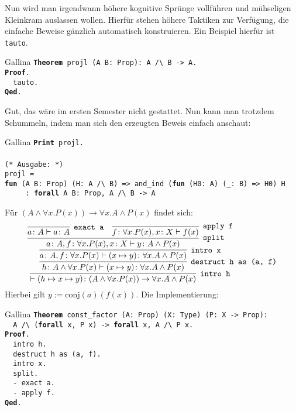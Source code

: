 \documentclass[8pt]{beamer}
\newcommand{\kw}[1]{\textbf{#1}}
\begin{document}
\begin{frame}
Nun wird man irgendwann höhere kognitive Sprünge vollführen und
mühseligen Kleinkram auslassen wollen. Hierfür stehen höhere Taktiken
zur Verfügung, die einfache Beweise gänzlich automatisch konstruieren.
Ein Beispiel hierfür ist \texttt{tauto}.\pause
\begin{block}{Gallina}
\texttt{\kw{Theorem} projl (A B: Prop): A /{\textbackslash} B -> A.\\
\kw{Proof}.\\
\ \ tauto.\\
\kw{Qed}.}
\end{block}\pause
Gut, das wäre im ersten Semester nicht gestattet. Nun kann man trotzdem
Schummeln, indem man sich den erzeugten Beweis einfach anschaut:
\begin{block}{Gallina}
\texttt{\kw{Print} projl.\\
\mbox{}\\
(* Ausgabe: *)\\
projl = \\
\kw{fun} (A B: Prop) (H: A /{\textbackslash} B) => and\_ind (\kw{fun} (H0: A) (\_: B) => H0) H\\
\ \ \ \ \ : \kw{forall} A B: Prop, A /{\textbackslash} B -> A}
\end{block}
\end{frame}

\begin{frame}
Für $(A\land\forall x. P(x))\to\forall x. A\land P(x)$ findet sich:\pause
\[
\infer[\texttt{intro h}]{\vdash (h\mapsto x\mapsto y)\colon (A\land\forall x. P(x))\to\forall x. A\land P(x)}{
  \infer[\texttt{destruct h as (a, f)}]{h\colon A\land\forall x. P(x)\vdash (x\mapsto y)\colon\forall x.A\land P(x)}{
    \infer[\texttt{intro x}]{a\colon A, f\colon \forall x.P(x)\vdash (x\mapsto y)\colon\forall x.A\land P(x)}{
      \infer[\texttt{split}]{a\colon A, f\colon \forall x.P(x), x\colon X\vdash y\colon A\land P(x)}{
        \infer[\texttt{exact a}]{a\colon A\vdash a\colon A}{}
      & \infer[\texttt{apply f}]{f\colon\forall x.P(x), x\colon X\vdash f(x)}{}}}}}
\]
Hierbei gilt $y:=\mathrm{conj}(a)(f(x))$. Die Implementierung:\pause

\begin{block}{Gallina}
\texttt{\kw{Theorem} const\_factor (A: Prop) (X: Type) (P: X -> Prop):\\
\ \ A /{\textbackslash} (\kw{forall} x, P x) -> \kw{forall} x, A /{\textbackslash} P x.\\
\kw{Proof}.\\
\ \ intro h.\\
\ \ destruct h as (a, f).\\
\ \ intro x.\\
\ \ split.\\
\ \ - exact a.\\
\ \ - apply f.\\
\kw{Qed}.}
\end{block}
\end{frame}
\end{document}
